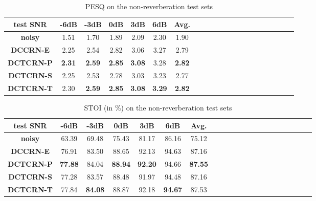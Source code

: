 \documentclass[journal,10pt]{IEEEtran}
\begin{document}
\begin{table}[t]  \centering
\small
\caption{PESQ on the non-reverberation test sets}
\label{tab:pesq}
\setlength{\tabcolsep}{1.7mm}
\begin{tabular}{c<{\centering}|c<{\centering}c<{\centering}c<{\centering}c<{\centering}c<{\centering}c<{\centering}c<{\centering}c<{\centering}c<{\centering}c<{\centering}|c<{\centering}c<{\centering}c<{\centering}c<{\centering}c<{\centering}c<{\centering}c<{\centering}c<{\centering}c<{\centering}c<{\centering}}
\hline
\hline
\textbf{test SNR} & \textbf{-6dB }& \textbf{-3dB} & \textbf{0dB} & \textbf{3dB} & \textbf{6dB} & \textbf{Avg.} \\
\hline
\hline
\textbf{noisy}     & 1.51 & 1.70 & 1.89 & 2.09 & 2.30 & 1.90 \\
\textbf{DCCRN-E}   & 2.25 & 2.54 & 2.82 & 3.06 & 3.27 & 2.79 \\
\textbf{DCTCRN-P}  & \textbf{2.31} & \textbf{2.59} & \textbf{2.85} & \textbf{3.08} & 3.28 & \textbf{2.82} \\
\textbf{DCTCRN-S}  & 2.25 & 2.53 & 2.78 & 3.03 & 3.23 & 2.77 \\
\textbf{DCTCRN-T}  & 2.30 & \textbf{2.59} & \textbf{2.85} & \textbf{3.08} & \textbf{3.29} & \textbf{2.82} \\
\hline
\hline
\end{tabular}
\end{table}

\begin{table}[t]  \centering
\small
\caption{STOI (in \%) on the non-reverberation test sets}
\label{tab:stoi}
\setlength{\tabcolsep}{1.7mm}
\begin{tabular}{c<{\centering}|c<{\centering}c<{\centering}c<{\centering}c<{\centering}c<{\centering}c<{\centering}c<{\centering}c<{\centering}c<{\centering}c<{\centering}|c<{\centering}c<{\centering}c<{\centering}c<{\centering}c<{\centering}c<{\centering}c<{\centering}c<{\centering}c<{\centering}c<{\centering}}
\hline
\hline
\textbf{test SNR} & \textbf{-6dB} & \textbf{-3dB} & \textbf{0dB} & \textbf{3dB} & \textbf{6dB} & \textbf{Avg.} \\
\hline
\hline
\textbf{noisy}     & 63.39 & 69.48 & 75.43 & 81.17 & 86.16 & 75.12 \\
\textbf{DCCRN-E}   & 76.91 & 83.50 & 88.65 & 92.13 & 94.63 & 87.16 \\
\textbf{DCTCRN-P}  & \textbf{77.88} & 84.04 & \textbf{88.94} & \textbf{92.20} & 94.66 & \textbf{87.55} \\
\textbf{DCTCRN-S}  & 77.28 & 83.57 & 88.48 & 91.97 & 94.48 & 87.16 \\
\textbf{DCTCRN-T}  & 77.84 & \textbf{84.08} & 88.87 & 92.18 & \textbf{94.67} & 87.53 \\
\hline
\hline
\end{tabular}
\end{table}
\end{document}
